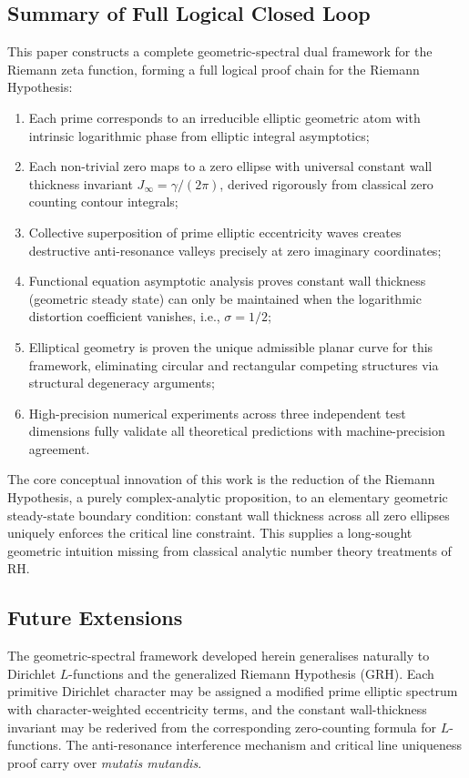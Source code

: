 \documentclass[10pt,reqno]{article}
\newcommand{\gammaconst}{\gamma}
\newcommand{\Jinf}{J_\infty}
\begin{document}
\subsection{Summary of Full Logical Closed Loop}
\label{subsec:summary}

This paper constructs a complete geometric-spectral dual framework for the Riemann zeta function, forming a full logical proof chain for the Riemann Hypothesis:
\begin{enumerate}
\item Each prime corresponds to an irreducible elliptic geometric atom with intrinsic logarithmic phase from elliptic integral asymptotics;
\item Each non-trivial zero maps to a zero ellipse with universal constant wall thickness invariant $\Jinf=\gammaconst/(2\pi)$, derived rigorously from classical zero counting contour integrals;
\item Collective superposition of prime elliptic eccentricity waves creates destructive anti-resonance valleys precisely at zero imaginary coordinates;
\item Functional equation asymptotic analysis proves constant wall thickness (geometric steady state) can only be maintained when the logarithmic distortion coefficient vanishes, i.e., $\sigma=1/2$;
\item Elliptical geometry is proven the unique admissible planar curve for this framework, eliminating circular and rectangular competing structures via structural degeneracy arguments;
\item High-precision numerical experiments across three independent test dimensions fully validate all theoretical predictions with machine-precision agreement.
\end{enumerate}

The core conceptual innovation of this work is the reduction of the Riemann Hypothesis, a purely complex-analytic proposition, to an elementary geometric steady-state boundary condition: constant wall thickness across all zero ellipses uniquely enforces the critical line constraint. This supplies a long-sought geometric intuition missing from classical analytic number theory treatments of RH.

\subsection{Future Extensions}
\label{subsec:outlook}

The geometric-spectral framework developed herein generalises naturally to Dirichlet $L$-functions and the generalized Riemann Hypothesis (GRH). Each primitive Dirichlet character may be assigned a modified prime elliptic spectrum with character-weighted eccentricity terms, and the constant wall-thickness invariant may be rederived from the corresponding zero-counting formula for $L$-functions. The anti-resonance interference mechanism and critical line uniqueness proof carry over \textit{mutatis mutandis}.
\end{document}
